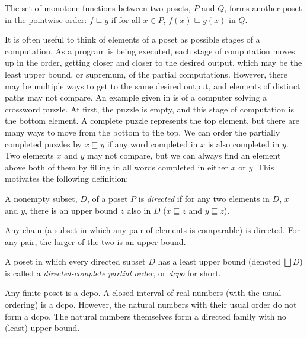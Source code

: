 \begin{proposition}
The set of monotone functions between two posets, $P$ and $Q$, forms another poset in the pointwise order: $f \sqsubseteq g$ if for all $x \in P$, $f(x) \sqsubseteq g(x)$ in $Q$.
\end{proposition}

It is often useful to think of elements of a poset as possible stages of a computation.  As a program is being executed, each stage of computation moves up in the order, getting closer and closer to the desired output, which may be the least upper bound, or supremum, of the partial computations.  However, there may be multiple ways to get to the same desired output, and elements of distinct paths may not compare.  An example given in \cite{goubault2013non} is of a computer solving a crossword puzzle.  At first, the puzzle is empty, and this stage of computation is the bottom element.  A complete puzzle represents the top element, but there are many ways to move from the bottom to the top.  We can order the partially completed puzzles by $x\sqsubseteq y$ if any word completed in $x$ is also completed in $y$.  Two elements $x$ and $y$ may not compare, but we can always find an element above both of them by filling in all words completed in either $x$ or $y$.  This motivates the following definition:

\begin{definition}
A nonempty subset, $D$, of a poset $P$ is \emph{directed} if for any two elements in $D$, $x$ and $y$, there is an upper bound $z$ also in $D$ ($x\sqsubseteq z$ and $y\sqsubseteq z$).
\end{definition}

\begin{example}
Any chain (a subset in which any pair of elements is comparable) is directed.  For any pair, the larger of the two is an upper bound.
\end{example}

\begin{definition}
A poset in which every directed subset $D$ has a least upper bound (denoted $\bigsqcup D$) is called a \emph{directed-complete partial order}, or \emph{dcpo} for short.
\end{definition}

\begin{example}
Any finite poset is a dcpo.  A closed interval of real numbers (with the usual ordering) is a dcpo.  However, the natural numbers with their usual order do not form a dcpo.  The natural numbers themselves form a directed family with no (least) upper bound.  
\end{example}

